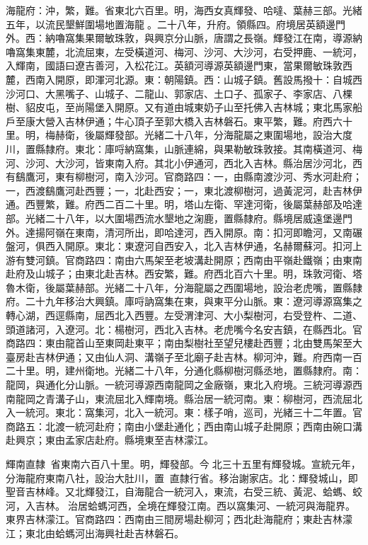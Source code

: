 \begin{pinyinscope}
海龍府：沖，繁，難。省東北六百里。明，海西女真輝發、哈噠、葉赫三部。光緒五年，以流民墾鮮圍場地置海龍。二十八年，升府。領縣四。府境居英額邊門外。西：納嚕窩集果爾敏珠敦，與興京分山脈，唐謂之長嶺。輝發江在南，導源納嚕窩集東麓，北流屈東，左受橫道河、梅河、沙河、大沙河，右受押鹿、一統河，入輝南，國語曰遼吉善河，入松花江。英額河導源英額邊門東，當果爾敏珠敦西麓，西南入開原，即渾河北源。東：朝陽鎮。西：山城子鎮。舊設馬撥十：自城西沙河口、大黑嘴子、山城子、二龍山、郭家店、土口子、孤家子、李家店、八棵樹、貂皮屯，至尚陽堡入開原。又有道由城東奶子山至托佛入吉林城；東北馬家船戶至康大營入吉林伊通；牛心頂子至郭大橋入吉林磐石。東平繁，難。府西六十里。明，梅赫衛，後屬輝發部。光緒二十八年，分海龍屬之東圍場地，設治大度川，置縣隸府。東北：庫哷納窩集，山脈連綿，與果勒敏珠敦接。其南橫道河、梅河、沙河、大沙河，皆東南入府。其北小伊通河，西北入吉林。縣治居沙河北，西有鷂鷹河，東有柳樹河，南入沙河。官商路四：一，由縣南渡沙河、秀水河赴府；一，西渡鷂鷹河赴西豐；一，北赴西安；一，東北渡柳樹河，過黃泥河，赴吉林伊通。西豐繁，難。府西二百二十里。明，塔山左衛、罕達河衛，後屬葉赫部及哈達部。光緒二十八年，以大圍場西流水墾地之淗鹿，置縣隸府。縣境居威遠堡邊門外。達揚阿嶺在東南，清河所出，即哈達河，西入開原。南：扣河即瞻河，又南碾盤河，俱西入開原。東北：東遼河自西安入，北入吉林伊通，名赫爾蘇河。扣河上游有雙河鎮。官商路四：南由六馬架至老坡溝赴開原；西南由平嶺赴鐵嶺；由東南赴府及山城子；由東北赴吉林。西安繁，難。府西北百六十里。明，珠敦河衛、塔魯木衛，後屬葉赫部。光緒二十八年，分海龍屬之西圍場地，設治老虎嘴，置縣隸府。二十九年移治大興鎮。庫哷訥窩集在東，與東平分山脈。東：遼河導源窩集之轉心湖，西逕縣南，屈西北入西豐。左受渭津河、大小梨樹河，右受登杵、二道、頭道諸河，入遼河。北：楊樹河，西北入吉林。老虎嘴今名安吉鎮，在縣西北。官商路四：東由龍首山至東岡赴東平；南由梨樹社至望兒樓赴西豐；北由雙馬架至大臺房赴吉林伊通；又由仙人洞、溝嶺子至北廟子赴吉林。柳河沖，難。府西南一百二十里。明，建州衛地。光緒二十八年，分通化縣柳樹河縣丞地，置縣隸府。南：龍岡，與通化分山脈。一統河導源西南龍岡之金廠嶺，東北入府境。三統河導源西南龍岡之青溝子山，東流屈北入輝南境。縣治居一統河南。東：柳樹河，西流屈北入一統河。東北：窩集河，北入一統河。東：樣子哨，巡司，光緒三十二年置。官商路五：北渡一統河赴府；南由小堡赴通化；西由南山城子赴開原；西南由碗口溝赴興京；東由孟家店赴府。縣境東至吉林濛江。

輝南直隸：省東南六百八十里。明，輝發部。今北三十五里有輝發城。宣統元年，分海龍府東南八社，設治大肚川，置，直隸行省。移治謝家店。北：輝發城山，即聖音吉林峰。又北輝發江，自海龍合一統河入，東流，右受三統、黃泥、蛤螞、蛟河，入吉林。治居蛤螞河西，全境在輝發江南。西以窩集河、一統河與海龍界。東界吉林濛江。官商路四：西南由三間房場赴柳河；西北赴海龍府；東赴吉林濛江；東北由蛤螞河出海興社赴吉林磐石。


\end{pinyinscope}
